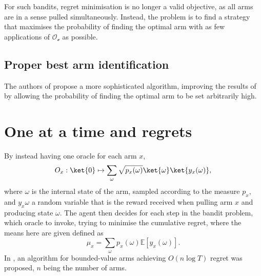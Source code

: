 For such bandits, regret minimisation is no longer a valid objective, as all arms are in a sense pulled simultaneously.
Instead, the problem is to find a strategy that maximises the probability of finding the optimal arm with as few applications of $\mathcal{O_e}$ as possible.

\subsection{Proper best arm identification}
The authors of \cite{wang2021} propose a more sophisticated algorithm, improving the results of \cite{casale2020} by allowing the probability of finding the optimal arm to be set arbitrarily high.

\section{One at a time and regrets}
By instead having one oracle for each arm $x$,
\begin{equation}
    O_x: \ket{0} \mapsto \sum_\omega \sqrt{p_x(\omega)} \ket{\omega} \ket{y_x(\omega)},
\end{equation}
where $\omega$ is the internal state of the arm, sampled according to the measure $p_x$, and $y_x{\omega}$ a random variable that is the reward received when pulling arm $x$ and producing state $\omega$.
The agent then decides for each step in the bandit problem, which oracle to invoke, trying to minimise the cumulative regret, where the means here are given defined as
\begin{equation}
    \mu_x = \sum_\omega p_x(\omega) \mathbb{E}[y_x(\omega)].
\end{equation}
In \cite{wan2022}, an algorithm for bounded-value arms achieving $O(n \log T)$ regret was proposed, $n$ being the number of arms.